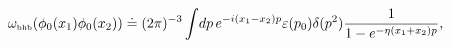 \begin{equation} \label{bhb}
\omega_{\mbox{\tiny bhb}} (\phi_0 (x_1) \phi_0 (x_2)) \doteq
(2 \pi)^{-3} \int \! dp \,
e^{-i(x_1-x_2)p}\varepsilon (p_{0})\delta (p^{2})
\frac{1}{1-e^{- \eta (x_1 + x_2)p}},
\end{equation}

